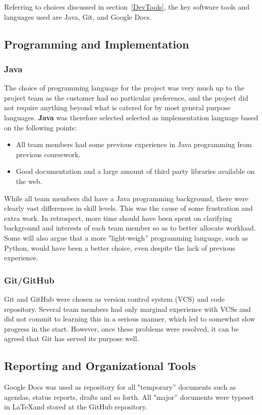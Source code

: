 Referring to choices discussed in section~\ref{DevTools}, the key
software tools and languages used are Java, Git, and Google
Docs. 

\subsection{Programming and Implementation}

\subsubsection{Java}
The choice of programming language for the project was very much up to the
project team as the customer had no particular preference, and the
project did not require anything beyond what is catered for by most
general purpose languages. \textbf{Java} was therefore selected 
selected as implementation language based on the following points:

\begin{itemize}
\item All team members had some previous experience in Java
  programming from previous coursework.
\item Good documentation and a large amount of third party libraries
  available on the web.
\end{itemize}

While all team members did have a Java programming background, there
were clearly vast differences in skill levels. This was the cause of
some frustration and extra work. In retrospect, more time should have been spent
on clarifying background and interests of each team member so as to
better allocate workload. Some will also argue that a more
"light-weigh'' programming language, such as Python, would have been a
better choice, even despite the lack of previous experience.

\subsubsection{Git/GitHub}
Git and GitHub were chosen as version control system (VCS) and code
repository. Several team members had only marginal experience with
VCSs and did not commit to learning this in a serious manner, which
led to somewhat slow progress in the start. However, once these problems
were resolved, it can be agreed that Git has served its purpose well.


\subsection{Reporting and Organizational Tools}
Google Docs was used as repository for all "temporary'' documents such
as agendas, status reports, drafts and so forth. All "major''
documents were typeset in \LaTeX and stored at the GitHub repository.


